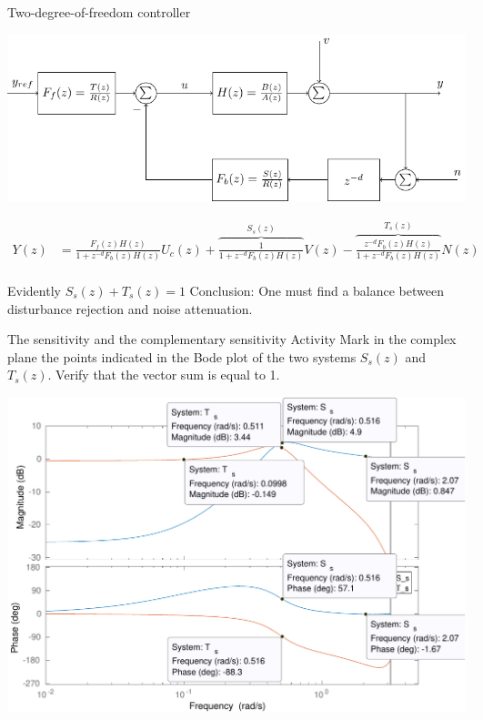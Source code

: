 \documentclass[presentation,aspectratio=169]{beamer}
\begin{document}
\begin{frame}[label={sec:orge8baa34}]{Two-degree-of-freedom controller}
\begin{center}
\includegraphics[width=0.7\linewidth]{../../figures/2dof-block-explicit}
\end{center}

\begin{align*}
Y(z)     &= \frac{F_f(z)H(z)}{1 + z^{-d}F_b(z)H(z)}U_c(z) + \overbrace{\frac{1}{1 + z^{-d}F_b(z)H(z)}}^{S_s(z)}V(z)  - \overbrace{\frac{z^{-d}F_b(z)H(z)}{1 + z^{-d}F_b(z)H(z)}}^{T_s(z)}N(z)\\
\end{align*}

\alert{Evidently} \(S_s(z) + T_s(z) = 1\) \alert{Conclusion:} One must find a balance between disturbance rejection and noise attenuation.
\end{frame}

\begin{frame}[label={sec:orgeae52d9}]{The sensitivity and the complementary sensitivity}
\alert{Activity} Mark in the complex plane the points indicated in the Bode plot of the two systems \(S_s(z)\) and \(T_s(z)\). Verify that the vector sum is equal to 1.
\begin{center}
\includegraphics[width=0.7\linewidth]{../matlab/bode-sensitivity-exercise-crop}
\end{center}
\end{frame}
\end{document}
